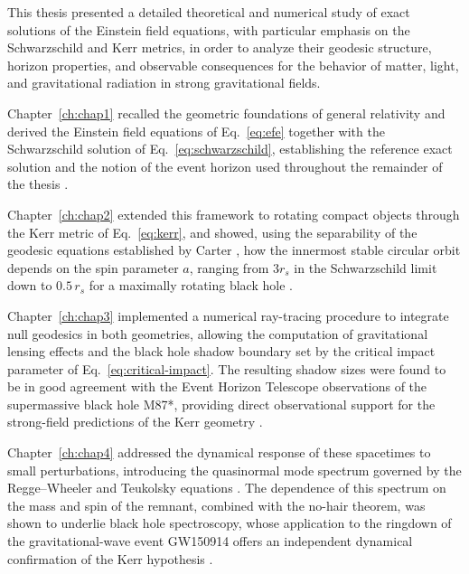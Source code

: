 \label{ch:conclusion}

This thesis presented a detailed theoretical and numerical study of exact solutions of the Einstein field equations, with particular emphasis on the Schwarzschild and Kerr metrics, in order to analyze their geodesic structure, horizon properties, and observable consequences for the behavior of matter, light, and gravitational radiation in strong gravitational fields.

Chapter~\ref{ch:chap1} recalled the geometric foundations of general relativity and derived the Einstein field equations of Eq.~\eqref{eq:efe} together with the Schwarzschild solution of Eq.~\eqref{eq:schwarzschild}, establishing the reference exact solution and the notion of the event horizon used throughout the remainder of the thesis \cite{einstein1916,schwarzschild1916}.

Chapter~\ref{ch:chap2} extended this framework to rotating compact objects through the Kerr metric of Eq.~\eqref{eq:kerr}, and showed, using the separability of the geodesic equations established by Carter \cite{carter1968}, how the innermost stable circular orbit depends on the spin parameter $a$, ranging from $3r_s$ in the Schwarzschild limit down to $0.5\,r_s$ for a maximally rotating black hole \cite{bardeen1972}.

Chapter~\ref{ch:chap3} implemented a numerical ray-tracing procedure to integrate null geodesics in both geometries, allowing the computation of gravitational lensing effects and the black hole shadow boundary set by the critical impact parameter of Eq.~\eqref{eq:critical-impact}. The resulting shadow sizes were found to be in good agreement with the Event Horizon Telescope observations of the supermassive black hole M87*, providing direct observational support for the strong-field predictions of the Kerr geometry \cite{eht2019}.

Chapter~\ref{ch:chap4} addressed the dynamical response of these spacetimes to small perturbations, introducing the quasinormal mode spectrum governed by the Regge--Wheeler and Teukolsky equations \cite{regge1957,teukolsky1973}. The dependence of this spectrum on the mass and spin of the remnant, combined with the no-hair theorem, was shown to underlie black hole spectroscopy, whose application to the ringdown of the gravitational-wave event GW150914 offers an independent dynamical confirmation of the Kerr hypothesis \cite{ligo2016,isi2019}.

